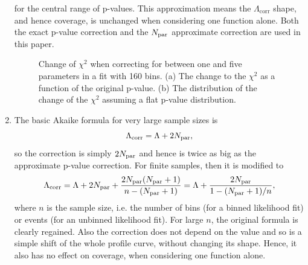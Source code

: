 \begin{enumerate}
for the central range of p-values. This approximation means the
$\Lambda_{\mathrm{corr}}$ shape, and hence coverage, is unchanged when considering one function alone. Both the
exact p-value
correction and the $N_{\rm par}$ approximate correction are used in this paper.
%
\begin{figure}[tbp]
\centering
\caption{Change of $\chi^2$ when correcting for between one and five parameters
in a fit with 160 bins. (a) The change to the $\chi^2$ as a function of the
original p-value. (b) The distribution of the change of
the $\chi^2$ assuming a flat p-value distribution.}
\label{fig:correction:DeltaChiSq}
\end{figure}


\item %
The basic Akaike formula for very large sample sizes is
\begin{displaymath}
\Lambda_{\mathrm{corr}} = \textrm{\ensuremath{\Lambda}} + 2N_{\rm par},
\end{displaymath}
so the correction is simply $ 2N_{\rm par}$ and
hence is twice as big as the approximate p-value correction.
For finite samples, then it is modified to
\begin{displaymath}
\Lambda_{\mathrm{corr}}
= \textrm{\ensuremath{\Lambda}} + 2N_{\rm par}  + \frac{2N_{\rm par}(N_{\rm par}+1)}{n-(N_{\rm par}+1)}
= \textrm{\ensuremath{\Lambda}} + \frac{2N_{\rm par}}{1-(N_{\rm par}+1)/n},
\end{displaymath}
where $n$ is the sample size, i.e. the number of bins (for a binned likelihood
fit) or events (for an unbinned likelihood fit). For large $n$, the original
formula is clearly regained. 
Also the correction does not depend on the \nll value and
so is a simple shift of
the whole profile curve, without changing its shape.
Hence, it also has no effect on coverage, when considering one function alone.
\end{enumerate}

